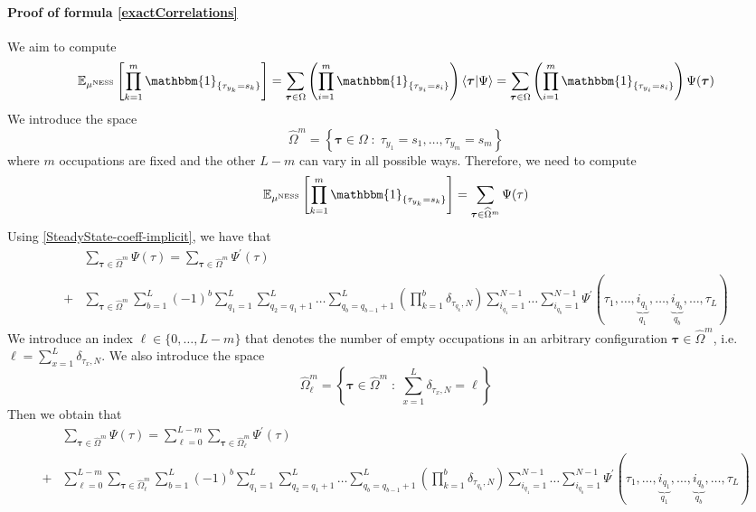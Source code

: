 \documentclass[10pt]{article}
\numberwithin{equation}{section}
\numberwithin{equation}{subsection}
\begin{document}
\paragraph{Proof of formula \eqref{exactCorrelations}}
We aim to compute
\begin{equation}
\mathbb{E}_{\mu^{\text{NESS}}}\left[\prod_{k=1}^{m}\mathbbm{1}_{\{\tau_{y_{k}}=s_{k}\}}\right]=\sum_{\bm{\tau}\in \Omega}\left(\prod_{i=1}^{m}\mathbbm{1}_{\{\tau_{y_{i}}=s_{i}\}}\right)\langle\bm{\tau}|\Psi\rangle=\sum_{\bm{\tau}\in \Omega}\left(\prod_{i=1}^{m}\mathbbm{1}_{\{\tau_{y_{i}}=s_{i}\}}\right)\Psi(\bm{\tau})
\end{equation}
We introduce the space 
\begin{equation}
	\widehat{\Omega}^{m}=\left\{\bm{\tau}\in \Omega\;:\; \tau_{y_{1}}=s_{1},\ldots,\tau_{y_{m}}=s_{m}\right\}
\end{equation}
where $m$ occupations are fixed and the other $L-m$ can vary in all possible ways. Therefore, we need to compute 
\begin{equation}
\mathbb{E}_{\mu^{\text{NESS}}}\left[\prod_{k=1}^{m}\mathbbm{1}_{\{\tau_{y_{k}}=s_{k}\}}\right]=\sum_{\bm{\tau}\in \widehat{\Omega}^{m}}\Psi(\tau)
\end{equation}
Using \eqref{SteadyState-coeff-implicit}, we have that 
\begin{align}
&\sum_{\bm{\tau}\in \widehat{\Omega}^{m}}\Psi(\tau)= \sum_{\bm{\tau}\in \widehat{\Omega}^{m}}\Psi^{'}(\tau)\nonumber
\\+&
\sum_{\bm{\tau}\in \widehat{\Omega}^{m}}\sum_{b=1}^{L}(-1)^{b}\sum_{q_{1}=1}^{L}\sum_{q_{2}=q_{1}+1}^{L}\ldots\sum_{q_{b}=q_{b-1}+1}^{L}\left(\prod_{k=1}^{b}\delta_{\tau_{q_{k}},N}\right)\sum_{i_{q_{1}}=1}^{N-1}\ldots\sum_{i_{q_{b}}=1}^{N-1}\Psi^{'}(\tau_{1},\ldots,\underbrace{i_{q_{1}}}_{q_{1}},\ldots,\underbrace{i_{q_{b}}}_{q_{b}},\ldots,\tau_{L})
\end{align}
We introduce an index $\ell\in \{0,\ldots, L-m\}$ that denotes the number of empty occupations in an arbitrary configuration $\bm{\tau}\in \widehat{\Omega}^{m}$, i.e. $\ell=\sum_{x=1}^{L}\delta_{\tau_{x},N}$. We also introduce the space 
\begin{equation}
\widehat{\Omega}^{m}_{\ell}=\left\{\bm{\tau}\in \widehat{\Omega}^{m}\;:\;\sum_{x=1}^{L}\delta_{\tau_{x},N}=\ell\right\}
\end{equation}
Then we obtain that 
\begin{align}
&\sum_{\bm{\tau}\in \widehat{\Omega}^{m}}\Psi(\tau)= \sum_{\ell=0}^{L-m}\sum_{\bm{\tau}\in \widehat{\Omega}^{m}_{\ell}}\Psi^{'}(\tau)\nonumber
\\+&
\sum_{\ell=0}^{L-m}\sum_{\bm{\tau}\in \widehat{\Omega}^{m}_{\ell}}\sum_{b=1}^{L}(-1)^{b}\sum_{q_{1}=1}^{L}\sum_{q_{2}=q_{1}+1}^{L}\ldots\sum_{q_{b}=q_{b-1}+1}^{L}\left(\prod_{k=1}^{b}\delta_{\tau_{q_{k}},N}\right)\sum_{i_{q_{1}}=1}^{N-1}\ldots\sum_{i_{q_{b}}=1}^{N-1}\Psi^{'}(\tau_{1},\ldots,\underbrace{i_{q_{1}}}_{q_{1}},\ldots,\underbrace{i_{q_{b}}}_{q_{b}},\ldots,\tau_{L})
\end{align}
\end{document}
